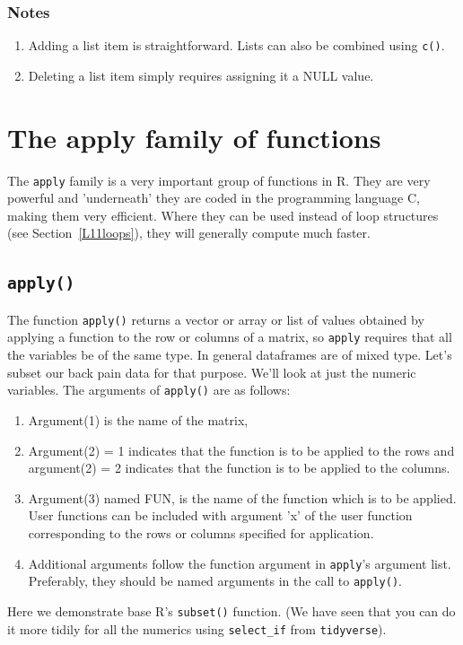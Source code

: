 \documentclass[titlepage]{book}\usepackage{knitr}
\begin{document}
\subsubsection{Notes}
\begin{enumerate}

\item{Adding a list item is straightforward. Lists can also be combined using \texttt{c()}.}
\item{Deleting a list item simply requires assigning it a NULL value.}
\end{enumerate}



\section{The apply family of functions}
The \texttt{apply} family is a very important group of functions in R.  They are very powerful and 'underneath' they are coded in the programming language C, making them very efficient.  Where they can be used instead of loop structures (see Section~\ref{L11loops}), they will generally compute much faster.

\subsection{\texttt{apply()}}

The function \texttt{apply()} returns a vector or array or list of values obtained by applying a function to the row or columns of a matrix, so \texttt{apply} requires that all the variables be of the same type. In general dataframes are of mixed type.  Let's subset our back pain data for that purpose. We'll look at just the numeric variables.   
The arguments of \texttt{apply()} are as follows:
\begin{enumerate}
\item{Argument(1) is the name of the matrix,}
\item{Argument(2) = 1 indicates that the function is to be applied to the rows  and argument(2) = 2 indicates that the function is to be applied to the columns.}
\item{Argument(3) named FUN, is the name of the function which is to be applied. User functions can be included with argument 'x' of the user function corresponding to the rows or columns specified for application.} 
\item{Additional arguments follow the function argument in \texttt{apply}'s argument list. Preferably, they should be named arguments in the call to \texttt{apply()}.}
\end{enumerate}
Here we demonstrate base R's \texttt{subset()} function. (We have seen that you can do it more tidily for all the numerics using \texttt{select\_if} from \texttt{tidyverse}).
\end{document}

